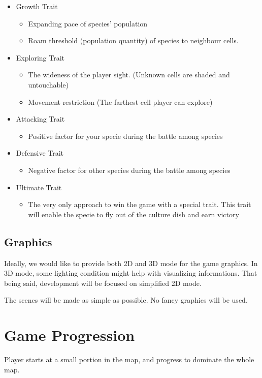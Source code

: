 \documentclass[12pt,a4paper]{article}
\begin{document}
	\begin{itemize}
		\item Growth Trait
		\begin{itemize}
			\item Expanding pace of species' population
			\item Roam threshold (population quantity) of species to neighbour cells.
		\end{itemize}
		\item Exploring Trait
		\begin{itemize}
			\item The wideness of the player sight. (Unknown cells are shaded and untouchable)
			\item Movement restriction (The farthest cell player can explore)
		\end{itemize}
		\item Attacking Trait
		\begin{itemize}
			\item Positive factor for your specie during the battle among species
		\end{itemize}
		\item Defensive Trait
		\begin{itemize}
			\item Negative factor for other species during the battle among species
		\end{itemize}
		\item Ultimate Trait
		\begin{itemize}
			\item The very only approach to win the game with a special trait. This trait will enable the specie to fly out of the culture dish and earn victory
		\end{itemize}
	\end{itemize}
	
\subsection{Graphics}
Ideally, we would like to provide both 2D and 3D mode for the game graphics. In 3D mode, some lighting condition might help with visualizing informations. That being said, development will be focused on simplified 2D mode.

The scenes will be made as simple as possible. No fancy graphics will be used.

\section{Game Progression}
Player starts  at a small portion in the map, and progress to dominate the whole map.
\end{document}
